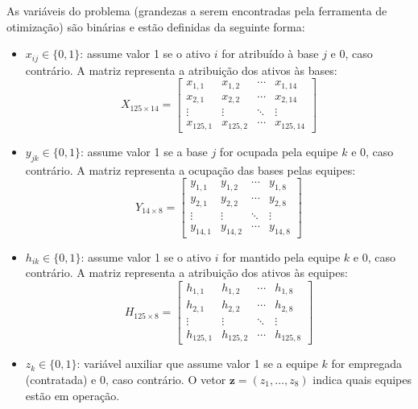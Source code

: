\documentclass[conference]{IEEEtran}
\begin{document}
As variáveis do problema (grandezas a serem encontradas pela ferramenta de otimização) são binárias e estão definidas da seguinte forma:
\begin{itemize}
  \item $x_{ij} \in \{0,1\}$: assume valor 1 se o ativo $i$ for atribuído à base $j$ e 0, caso contrário. A matriz representa a atribuição dos ativos às bases:
  \begin{equation*}
  X_{125\times14} =
  \begin{bmatrix}
  x_{1,1} & x_{1,2} & \cdots & x_{1,14}\\
  x_{2,1} & x_{2,2} & \cdots & x_{2,14}\\
  \vdots & \vdots & \ddots & \vdots\\
  x_{125,1} & x_{125,2} & \cdots & x_{125,14}
  \end{bmatrix}
  \end{equation*}
  \item $y_{jk} \in \{0,1\}$: assume valor 1 se a base $j$ for ocupada pela equipe $k$ e 0, caso contrário. A matriz representa a ocupação das bases pelas equipes:
  \begin{equation*}
  Y_{14\times8} =
  \begin{bmatrix}
  y_{1,1} & y_{1,2} & \cdots & y_{1,8}\\
  y_{2,1} & y_{2,2} & \cdots & y_{2,8}\\
  \vdots & \vdots & \ddots & \vdots\\
  y_{14,1} & y_{14,2} & \cdots & y_{14,8}
  \end{bmatrix}
  \end{equation*}
  \item $h_{ik} \in \{0,1\}$: assume valor 1 se o ativo $i$ for mantido pela equipe $k$ e 0, caso contrário. A matriz representa a atribuição dos ativos às equipes:
  \begin{equation*}
  H_{125\times8} =
  \begin{bmatrix}
  h_{1,1} & h_{1,2} & \cdots & h_{1,8}\\
  h_{2,1} & h_{2,2} & \cdots & h_{2,8}\\
  \vdots & \vdots & \ddots & \vdots\\
  h_{125,1} & h_{125,2} & \cdots & h_{125,8}
  \end{bmatrix}
  \end{equation*}
  \item $z_k \in \{0,1\}$: variável auxiliar que assume valor 1 se a equipe $k$ for empregada (contratada) e 0, caso contrário. O vetor $\mathbf{z} = (z_1,\dots,z_8)$ indica quais equipes estão em operação.
\end{itemize}
\end{document}
